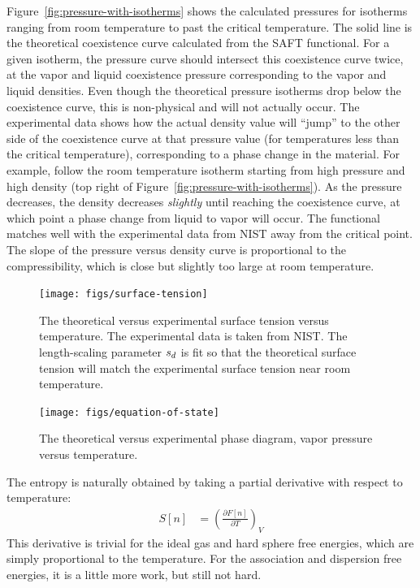 \documentclass[letterpaper,twocolumn,amsmath,amssymb,prb]{revtex4-1}
\begin{document}
Figure~\ref{fig:pressure-with-isotherms} shows the calculated pressures for
isotherms ranging from room temperature to past the critical temperature. The
solid line is the theoretical coexistence curve calculated from the SAFT
functional. For a given isotherm, the pressure curve should intersect this
coexistence curve twice, at the vapor and liquid coexistence 
pressure corresponding to the vapor and liquid densities. Even
though the theoretical pressure isotherms drop below the coexistence curve,
this is non-physical and will not actually occur. The experimental data shows
how the actual density value will ``jump'' to the other side of 
the coexistence curve at that pressure value (for
temperatures less than the critical temperature), corresponding to a phase 
change in the material. For example, follow the room temperature isotherm
starting from high pressure and high density (top right of 
Figure~\ref{fig:pressure-with-isotherms}).
As the pressure decreases, the density decreases \emph{slightly} until reaching
the coexistence curve, at which point a phase change from liquid to vapor
will occur. The
functional matches well with the experimental data from NIST away from the
critical point. The slope of the pressure versus density curve is proportional
to the compressibility, which is close but slightly too large at room
temperature. 

\begin{figure}
\begin{center}
\texttt{[image: figs/surface-tension]}
\end{center}
\caption{The theoretical versus experimental surface tension
  versus temperature. The experimental data is taken from NIST.\cite{nistwater}
  The length-scaling parameter $s_d$ is fit so that the theoretical surface tension
  will match the experimental surface tension near room temperature.}
\label{fig:surface-tension}
\end{figure}

\begin{figure}
\begin{center}
\texttt{[image: figs/equation-of-state]}
\end{center}
\caption{The theoretical versus experimental phase diagram, vapor
  pressure versus temperature.  }
\label{fig:equation-of-state}
\end{figure}

The entropy is naturally obtained by taking a partial derivative with
respect to temperature:
\begin{align}
  S[n] &= \left(\frac{\partial F[n]}{\partial T}\right)_{V}
\end{align}
This derivative is trivial for the ideal gas and hard sphere free
energies, which are simply proportional to the temperature.  For the
association and dispersion free energies, it is a little more work,
but still not hard.
\end{document}
